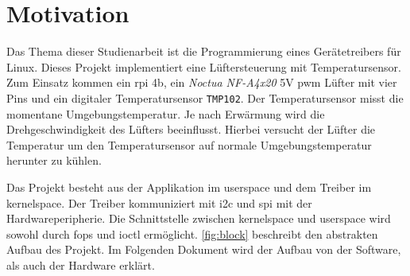 \section{Motivation}

Das Thema dieser Studienarbeit ist die Programmierung eines Gerätetreibers für Linux.
Dieses Projekt implementiert eine Lüftersteuerung mit Temperatursensor.
Zum Einsatz kommen ein \gls{rpi} 4b, ein \textit{Noctua NF-A4x20} 5V \gls{pwm} Lüfter mit vier Pins und ein digitaler Temperatursensor \texttt{TMP102}.
Der Temperatursensor misst die momentane Umgebungstemperatur.
Je nach Erwärmung wird die Drehgeschwindigkeit des Lüfters beeinflusst.
Hierbei versucht der Lüfter die Temperatur um den Temperatursensor auf normale Umgebungstemperatur herunter zu kühlen.

Das Projekt besteht aus der Applikation im \gls{userspace} und dem Treiber im \gls{kernelspace}.
Der Treiber kommuniziert mit \gls{i2c} und \gls{spi} mit der Hardwareperipherie.
Die Schnittstelle zwischen \gls{kernelspace} und \gls{userspace} wird sowohl durch \gls{fops} und \gls{ioctl} ermöglicht.
\autoref{fig:block} beschreibt den abstrakten Aufbau des Projekt.
Im Folgenden Dokument wird der Aufbau von der Software, als auch der Hardware erklärt.

